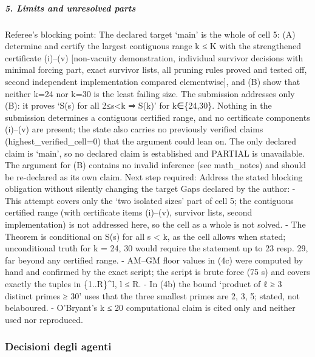\documentclass[11pt,a4paper]{article}
\begin{document}
\subparagraph{5. Limits and unresolved
parts}\label{limits-and-unresolved-parts}

Referee's blocking point: The declared target `main' is the whole of
cell 5: (A) determine and certify the largest contiguous range k ≤ K
with the strengthened certificate (i)--(v) {[}non-vacuity demonstration,
individual survivor decisions with minimal forcing part, exact survivor
lists, all pruning rules proved and tested off, second independent
implementation compared elementwise{]}, and (B) show that neither k=24
nor k=30 is the least failing size. The submission addresses only (B):
it proves `S(s) for all 2≤s\textless k ⇒ S(k)' for k∈\{24,30\}. Nothing
in the submission determines a contiguous certified range, and no
certificate components (i)--(v) are present; the state also carries no
previously verified claims (highest\_verified\_cell=0) that the argument
could lean on. The only declared claim is `main', so no declared claim
is established and PARTIAL is unavailable. The argument for (B) contains
no invalid inference (see math\_notes) and should be re-declared as its
own claim. Next step required: Address the stated blocking obligation
without silently changing the target Gaps declared by the author: - This
attempt covers only the `two isolated sizes' part of cell 5; the
contiguous certified range (with certificate items (i)--(v), survivor
lists, second implementation) is not addressed here, so the cell as a
whole is not solved. - The Theorem is conditional on S(s) for all s
\textless{} k, as the cell allows when stated; unconditional truth for k
= 24, 30 would require the statement up to 23 resp. 29, far beyond any
certified range. - AM--GM floor values in (4c) were computed by hand and
confirmed by the exact script; the script is brute force (75 s) and
covers exactly the tuples in \{1..\textbar R\textbar\}\^{}l, l ≤
\textbar R\textbar. - In (4b) the bound `product of ℓ ≥ 3 distinct
primes ≥ 30' uses that the three smallest primes are 2, 3, 5; stated,
not belaboured. - O'Bryant's k ≤ 20 computational claim is cited only
and neither used nor reproduced.

\subsubsection{Decisioni degli agenti}
\end{document}
